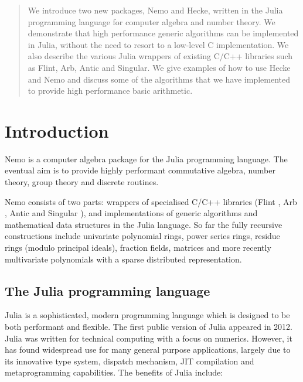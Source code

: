 \documentclass{sig-alternate-05-2015}
\begin{document}
\begin{abstract}
We introduce two new packages, Nemo and Hecke, written in the Julia programming language
for computer algebra and number theory.
We demonstrate that high performance generic
algorithms can be implemented in Julia, without the need to resort to a low-level C
implementation. We also describe the various Julia wrappers of existing C/C++ libraries
such as Flint, Arb, Antic and Singular. We give examples of how to use Hecke and Nemo and discuss
some of the algorithms that we have implemented to provide high performance basic
arithmetic.
\end{abstract}


\section{Introduction}

Nemo is a computer algebra package for the Julia programming language. The eventual aim is
to provide highly performant commutative algebra, number theory, group theory and discrete
routines.

Nemo consists of two parts: wrappers of specialised C/C++
libraries (Flint \cite{flint}, Arb \cite{arb}, Antic \cite{antic} and Singular
\cite{singular}), and
implementations of generic algorithms and mathematical data
structures in the Julia language. So far the fully recursive constructions include
univariate polynomial rings, power series rings, residue rings (modulo principal ideals),
fraction fields, matrices and more recently multivariate polynomials with a sparse
distributed representation.

\subsection{The Julia programming language}

Julia \cite{julia} is a sophisticated, modern programming language which is designed
to be both performant and flexible.
The first public version of Julia appeared in 2012. 
Julia was written for technical computing with a
focus on numerics. However, it has found widespread use for many general purpose
applications, largely due to its innovative type system, dispatch mechanism, JIT
compilation and metaprogramming capabilities.
The benefits of Julia include:
\end{document}
